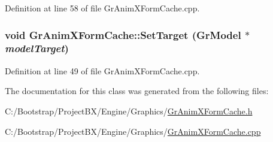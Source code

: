 Definition at line 58 of file GrAnimXFormCache.cpp.\hypertarget{class_gr_anim_x_form_cache_982f730a4b0168591c3b809c5a5ac92e}{
\subsubsection[{SetTarget}]{\setlength{\rightskip}{0pt plus 5cm}void GrAnimXFormCache::SetTarget ({\bf GrModel} $\ast$ {\em modelTarget})}}
\label{class_gr_anim_x_form_cache_982f730a4b0168591c3b809c5a5ac92e}




Definition at line 49 of file GrAnimXFormCache.cpp.

The documentation for this class was generated from the following files:\begin{CompactItemize}
\item 
C:/Bootstrap/ProjectBX/Engine/Graphics/\hyperlink{_gr_anim_x_form_cache_8h}{GrAnimXFormCache.h}\item 
C:/Bootstrap/ProjectBX/Engine/Graphics/\hyperlink{_gr_anim_x_form_cache_8cpp}{GrAnimXFormCache.cpp}\end{CompactItemize}
